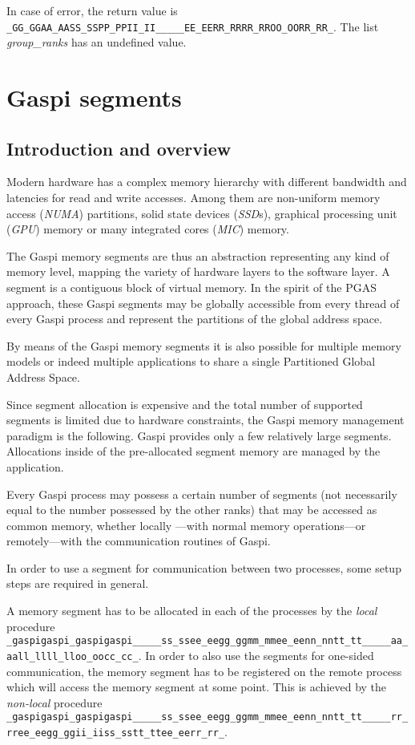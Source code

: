\documentclass[a4paper]{article}
\makeatletter
\newlength{\st}\setlength{\st}{0pt}
\newcommand{\zerowsep}{\hskip 0pt plus 0.1pt minus 0.1pt}
\newcommand{\ZSEP}[1]{\ifx#1\@@@EOZ@@@\let\next\relax\else\ifx#1\_#1\zerowsep\else#1\fi\let\next\ZSEP\fi\next}
\newcommand{\zsep}[1]{\ZSEP{}#1\@@@EOZ@@@}
\newcommand{\gaspiprefix}{gaspi}
\newcommand{\GASPI}{{\sc Gaspi}}
\newcommand{\function}[1]{{\tt #1}}
\newcommand{\parameter}[1]{{\it #1}}
\newcommand{\gaspifunction}[1]{\function{\protect\zsep{\gaspiprefix\_#1}}}
\newcommand{\GASPIGERR}{{\tt\protect\zsep{GASPI\_ERROR}}}
\newcommand{\gaspisemantic}[1]{{\emph{#1}}}
\makeatother
\begin{document}
In case of error, the return value is \GASPIGERR{}. The list
\parameter{group\_ranks} has an undefined value.

\section{\GASPI{} segments}

\subsection{Introduction and overview}

Modern hardware has a complex memory hierarchy with different
bandwidth and latencies for read and write accesses. Among them are
non-uniform memory access (\emph{NUMA}) partitions, solid state
devices (\emph{SSD}s), graphical processing unit (\emph{GPU}) memory
or many integrated cores (\emph{MIC}) memory.

The \GASPI{} memory segments are thus an abstraction representing
any kind of memory level, mapping the variety of hardware layers to the
software layer. A segment is a contiguous block of virtual memory.
In the spirit of the PGAS approach, these \GASPI{}
segments may be globally accessible from every thread of every \GASPI{}
process and represent the partitions of the global address space.

By means of the \GASPI{} memory segments it is also possible for multiple
memory models or indeed multiple applications to share a single Partitioned Global
Address Space.

Since segment allocation is expensive and the total number of supported
segments is limited due to hardware constraints, the \GASPI{} memory
management paradigm is the following.
\GASPI{} provides only a few relatively large segments.
Allocations inside of the pre-allocated segment memory are managed
by the application.

Every \GASPI{} process may possess a certain number of segments (not
necessarily equal to the number possessed by the other ranks) that may be accessed as common memory,
whether locally ---with normal memory operations---or remotely---with
the communication routines of \GASPI{}.

In order to use a segment for communication between two processes,
some setup steps are required in general.

A memory segment has to be allocated in each of the processes
by the \gaspisemantic{local} procedure \gaspifunction{segment\_alloc}.
In order to also use the segments for one-sided communication, the memory segment
has to be registered on the remote process which will
access the memory segment at some point. This is achieved by the
\gaspisemantic{non-local} procedure \gaspifunction{segment\_register}.
\end{document}
